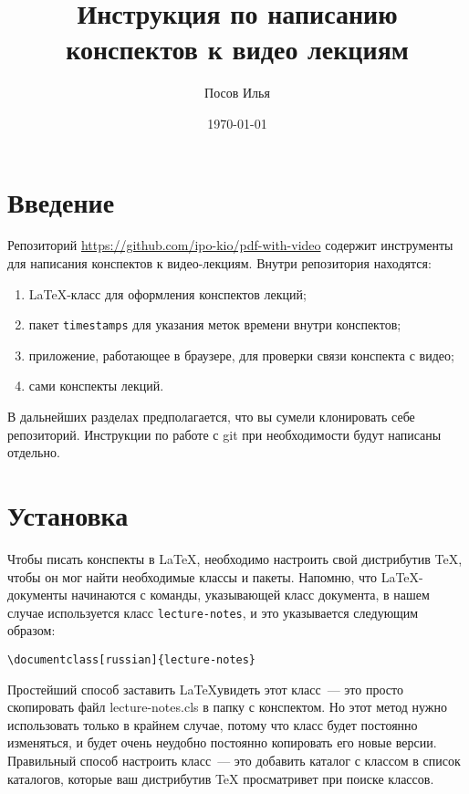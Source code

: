 \documentclass{article}
\title{Инструкция по написанию конспектов к видео лекциям}
\author{Посов Илья}
\date{\today}
\begin{document}
    \maketitle


    \section{Введение}
    Репозиторий \url{https://github.com/ipo-kio/pdf-with-video} содержит инструменты для написания конспектов к
    видео-лекциям.
    Внутри репозитория находятся:
    \begin{enumerate}
        \item \LaTeX-класс для оформления конспектов лекций;
        \item пакет \texttt{timestamps} для указания меток времени внутри конспектов;
        \item приложение, работающее в браузере, для проверки связи конспекта с видео;
        \item сами конспекты лекций.
    \end{enumerate}

    В дальнейших разделах предполагается, что вы сумели клонировать себе репозиторий.
    Инструкции по работе с git
    при необходимости будут написаны отдельно.


    \section{Установка}
    Чтобы писать конспекты в \LaTeX, необходимо настроить свой дистрибутив \TeX, чтобы он мог найти
    необходимые классы и пакеты.
    Напомню, что \LaTeX-документы начинаются с команды, указывающей класс документа, в нашем случае
    используется класс \texttt{lecture-notes}, и это указывается следующим образом:

    \begin{verbatim}\documentclass[russian]{lecture-notes}
    \end{verbatim}

    Простейший способ заставить \LaTeX увидеть этот класс~--- это просто скопировать файл lecture-notes.cls
    в папку с конспектом. Но этот метод нужно использовать только в крайнем случае, потому что класс будет
    постоянно изменяться, и будет очень неудобно постоянно копировать его новые версии. Правильный способ настроить
    класс~--- это добавить каталог с классом в список каталогов, которые ваш дистрибутив \TeX
    просматривет при поиске классов.
\end{document}
